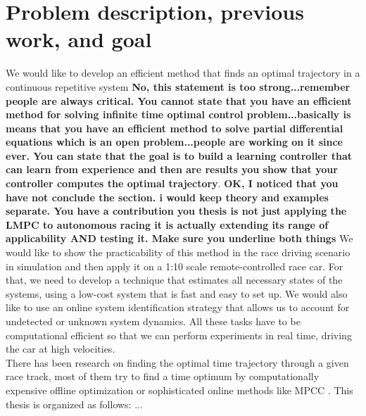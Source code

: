 \section{Problem description, previous work, and goal}
We would like to develop an efficient method that finds an optimal trajectory in a continuous repetitive system
{\bfseries{No, this statement is too strong...remember people are always critical. You cannot state that you have an efficient method for solving infinite time optimal control problem...basically is means that you have an efficient method to solve partial differential equations which is an open problem...people are working on it since ever. You can state that the goal is to build a learning controller that can learn from experience and then are results you show that your controller computes the optimal trajectory}}. {\bfseries{OK, I noticed that you have not conclude the section. i would keep theory and examples separate. You have a contribution you thesis is not just applying the LMPC to autonomous racing it is actually extending its range of applicability AND testing it. Make sure you underline both things}}
We would like to show the practicability of this method in the race driving scenario in simulation and then apply it on a 1:10 scale remote-controlled race car. For that, we need to develop a technique that estimates all necessary states of the systems, using a low-cost system that is fast and easy to set up. We would also like to use an online system identification strategy that allows us to account for undetected or unknown system dynamics. All these tasks have to be computational efficient so that we can perform experiments in real time, driving the car at high velocities.\\
There has been research on finding the optimal time trajectory through a given race track, most of them try to find a time optimum by computationally expensive offline optimization or sophisticated online methods like MPCC \cite{Liniger2015}.
This thesis is organized as follows: ...
